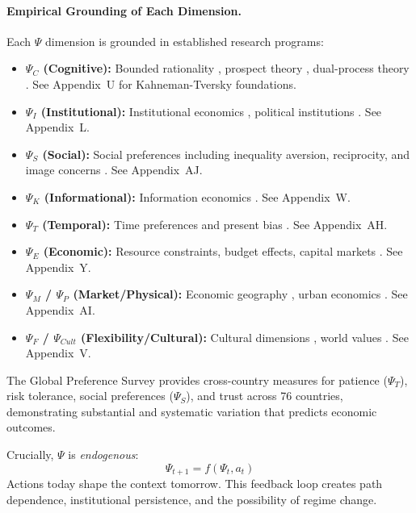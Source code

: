 \paragraph{Empirical Grounding of Each Dimension.}
Each $\Psi$ dimension is grounded in established research programs:
\begin{itemize}
  \item \textbf{$\Psi_C$ (Cognitive):} Bounded rationality \citep{simon1962},
        prospect theory \citep{kahnemantversky1979}, dual-process theory
        \citep{kahneman2011}. See Appendix~U for Kahneman-Tversky foundations.
  \item \textbf{$\Psi_I$ (Institutional):} Institutional economics \citep{north1990institutions},
        political institutions \citep{acemoglurobinson2012}. See Appendix~L.
  \item \textbf{$\Psi_S$ (Social):} Social preferences including inequality aversion,
        reciprocity, and image concerns \citep{fehrcharness2024}. See Appendix~AJ.
  \item \textbf{$\Psi_K$ (Informational):} Information economics
        \citep{akerlof1970,spence1973,stiglitz2000}. See Appendix~W.
  \item \textbf{$\Psi_T$ (Temporal):} Time preferences and present bias
        \citep{laibson1997,frederick2002time}. See Appendix~AH.
  \item \textbf{$\Psi_E$ (Economic):} Resource constraints, budget effects,
        capital markets \citep{fama1970efficient}. See Appendix~Y.
  \item \textbf{$\Psi_M$ / $\Psi_P$ (Market/Physical):} Economic geography \citep{krugman1991},
        urban economics \citep{glaeser2008}. See Appendix~AI.
  \item \textbf{$\Psi_F$ / $\Psi_{Cult}$ (Flexibility/Cultural):} Cultural dimensions 
        \citep{hofstede1980,house2004}, world values \citep{inglehart2014}. See Appendix~V.
\end{itemize}

The Global Preference Survey \citep{falk2018} provides cross-country measures
for patience ($\Psi_T$), risk tolerance, social preferences ($\Psi_S$), and
trust across 76 countries, demonstrating substantial and systematic variation
that predicts economic outcomes.


Crucially, $\Psi$ is \emph{endogenous}:
\begin{equation}
  \Psi_{t+1} = f(\Psi_t, a_t)
\end{equation}
Actions today shape the context tomorrow. This feedback loop creates path dependence, institutional persistence, and the possibility of regime change.

